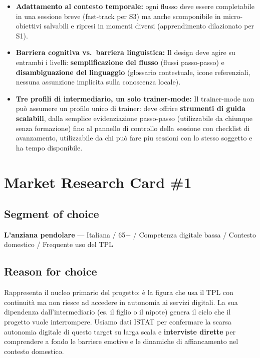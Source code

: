 \documentclass[11pt,a4paper]{article}
\begin{document}
\begin{itemize}[leftmargin=*,itemsep=6pt]

    \item \textbf{Adattamento al contesto temporale:}
    ogni flusso deve 
    essere completabile in una sessione breve (fast-track per S3) ma anche 
    scomponibile in micro-obiettivi salvabili e ripresi in momenti diversi 
    (apprendimento dilazionato per S1).
    
    \item \textbf{Barriera cognitiva vs.\ barriera linguistica:}
    Il design deve agire su entrambi i livelli: \textbf{semplificazione 
    del flusso} (flussi passo-passo) e \textbf{disambiguazione del 
    linguaggio} (glossario contestuale, icone referenziali, nessuna assunzione 
    implicita sulla conoscenza locale).

    \item \textbf{Tre profili di intermediario, un solo 
    trainer-mode:}
    Il trainer-mode non può 
    assumere un profilo unico di trainer: deve offrire \textbf{strumenti di 
    guida scalabili}, dalla semplice evidenziazione passo-passo (utilizzabile 
    da chiunque senza formazione) fino al pannello di controllo della sessione 
    con checklist di avanzamento, utilizzabile da chi può fare piu sessioni con lo stesso soggetto e ha tempo disponibile.

\end{itemize}

\newpage 

\section*{Market Research Card \#1}

\subsection*{Segment of choice}
\begin{tcolorbox}[colback=backgroundColor,colframe=borderColor,arc=2mm]
\textbf{L'anziana pendolare} --- Italiana / 65+ / Competenza digitale bassa / Contesto domestico / Frequente uso del TPL
\end{tcolorbox}

\subsection*{Reason for choice}
\begin{tcolorbox}[colback=backgroundColor,colframe=borderColor,arc=2mm]
Rappresenta il nucleo primario del progetto: è la figura che usa il TPL con continuità ma non riesce ad accedere in autonomia ai servizi digitali. La sua dipendenza dall'intermediario (es. il figlio o il nipote) genera il ciclo che il progetto vuole interrompere. Usiamo dati ISTAT per confermare la scarsa autonomia digitale di questo target su larga scala e \textbf{interviste dirette} per comprendere a fondo le barriere emotive e le dinamiche di affiancamento nel contesto domestico.
\end{tcolorbox}
\end{document}

